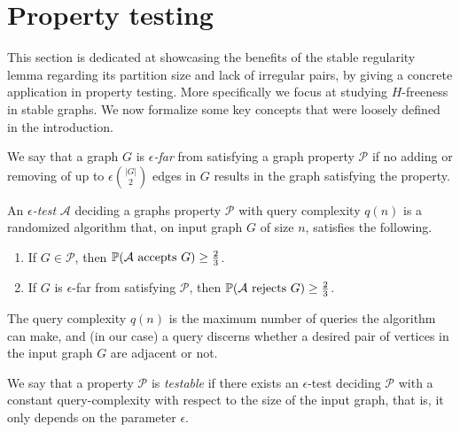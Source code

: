 \section{Property testing} \label{sec:section_6}

    This section is dedicated at showcasing the benefits of the stable regularity lemma regarding its partition size
    and lack of irregular pairs, by giving a concrete application in property testing.
    More specifically we focus at studying $H$-freeness in stable graphs.
    We now formalize some key concepts that were loosely defined in the introduction.

    \begin{definition}
        We say that a graph $G$ is \emph{$\epsilon$-far} from satisfying a graph property $\mathcal{P}$ if no adding or
        removing of up to $\epsilon {|G| \choose 2}$ edges in $G$ results in the graph satisfying the property.
    \end{definition}

    \begin{definition} \label{def:epsilon_test}
        An \emph{$\epsilon$-test} $\mathcal{A}$ deciding a graphs property $\mathcal{P}$ with query complexity
        $q(n)$ is a randomized algorithm that, on input graph $G$ of size $n$,
        satisfies the following.
        \begin{enumerate}
            \item If $G \in \mathcal{P}$, then $\mathbb{P}( \mathcal{A} \text{ accepts } G ) \geq \frac{2}{3}$.
            \item If $G$ is $\epsilon$-far from satisfying $\mathcal{P}$,
                then $\mathbb{P}( \mathcal{A} \text{ rejects } G ) \geq \frac{2}{3}$.
        \end{enumerate}
        The query complexity $q(n)$ is the maximum number of queries the algorithm can make, and (in our case)
        a query discerns whether a desired pair of vertices in the input graph $G$ are adjacent or not.
    \end{definition}

    \begin{definition}
        We say that a property $\mathcal{P}$ is \emph{testable} if there exists an $\epsilon$-test deciding $\mathcal{P}$
        with a constant query-complexity with respect to the size of the input graph, that is, it only depends on the
        parameter $\epsilon$.
    \end{definition}

